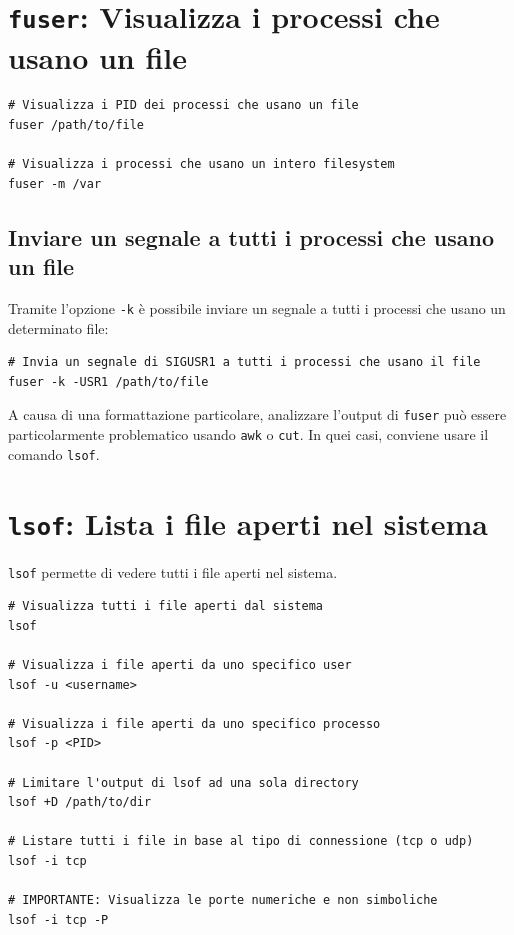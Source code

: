 \documentclass[a4paper]{report}
\newenvironment{info}{\begin{tcolorbox}[fonttitle=\sffamily\bfseries\large,title=Info,colframe=blue!75!white]}{\end{tcolorbox}}
\newenvironment{code}{\begin{tcolorbox}[size=small]}{\end{tcolorbox}}
\begin{document}
\section{\texttt{fuser}: Visualizza i processi che usano un file}

\begin{code} 
\begin{lstlisting}
# Visualizza i PID dei processi che usano un file
fuser /path/to/file

# Visualizza i processi che usano un intero filesystem
fuser -m /var
\end{lstlisting}
\end{code}

\subsection{Inviare un segnale a tutti i processi che usano un file}

Tramite l'opzione \texttt{-k} è possibile inviare un segnale a tutti i processi che usano un determinato file:

\begin{code} 
\begin{lstlisting}
# Invia un segnale di SIGUSR1 a tutti i processi che usano il file
fuser -k -USR1 /path/to/file
\end{lstlisting}
\end{code}

\begin{info}
	A causa di una formattazione particolare, analizzare l'output di \texttt{fuser} può essere particolarmente problematico usando \texttt{awk} o \texttt{cut}. In quei casi, conviene usare il comando \texttt{lsof}.
\end{info}

\section{\texttt{lsof}: Lista i file aperti nel sistema}

\texttt{lsof} permette di vedere tutti i file aperti nel sistema.

\begin{code} 
\begin{lstlisting}
# Visualizza tutti i file aperti dal sistema
lsof

# Visualizza i file aperti da uno specifico user
lsof -u <username>

# Visualizza i file aperti da uno specifico processo
lsof -p <PID>

# Limitare l'output di lsof ad una sola directory
lsof +D /path/to/dir

# Listare tutti i file in base al tipo di connessione (tcp o udp)
lsof -i tcp

# IMPORTANTE: Visualizza le porte numeriche e non simboliche
lsof -i tcp -P
\end{lstlisting}
\end{code}
\end{document}
